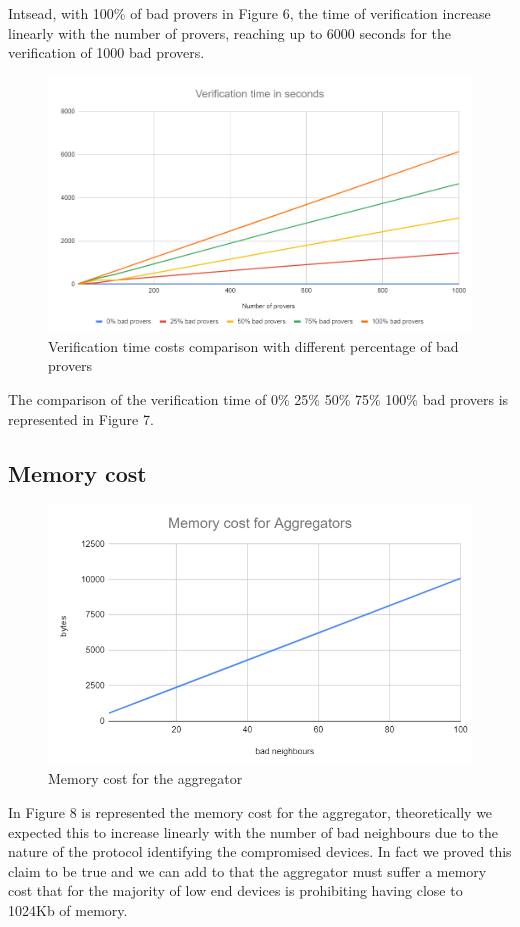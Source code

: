 \documentclass[10pt, a4paper, twocolumn]{article} %
\begin{document}
Intsead, with 100\% of bad provers in Figure 6, the time of verification increase linearly with the number of provers, reaching up to 6000 seconds for the verification of 1000 bad provers.\\
\begin{figure}
	\includegraphics[width=\linewidth]{images/verification_comparison.png} %
	\caption{Verification time costs comparison with different percentage of bad provers} %
	\label{bear} %
\end{figure}
The comparison of the verification time of 0\% 25\% 50\% 75\% 100\% bad provers is represented in Figure 7.\\

\subsection{Memory cost}
\begin{figure}
	\includegraphics[width=\linewidth]{images/memorycost.png} %
	\caption{Memory cost for the aggregator } %
	\label{bear} %
\end{figure}
In Figure 8 is represented the memory cost for the aggregator, theoretically we expected this to increase linearly with the number of bad neighbours due to the nature of the protocol identifying the compromised devices. In fact we proved this claim to be true and we can add to that the aggregator must suffer a memory cost that for the majority of low end devices is prohibiting having close to 1024Kb of memory.\\
\end{document}
